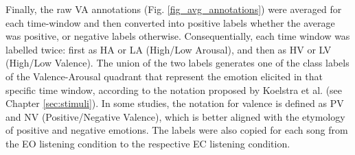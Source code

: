 Finally, the raw VA annotations (Fig. \ref{fig_avg_annotations}) were averaged for each time-window and then converted into positive labels whether the average was positive, or negative labels otherwise. Consequentially, each time window was labelled twice: first as HA or LA (High/Low Arousal), and then as HV or LV (High/Low Valence). The union of the two labels generates one of the class labels of the Valence-Arousal quadrant that represent the emotion elicited in that specific time window, according to the notation proposed by Koelstra et al. \cite{koelstra_deap_2012} (see Chapter \ref{sec:stimuli}). In some studies, the notation for valence is defined as PV and NV (Positive/Negative Valence), which is better aligned with the etymology of positive and negative emotions. The labels were also copied for each song from the \ac{EO} listening condition to the respective \ac{EC} listening condition.

